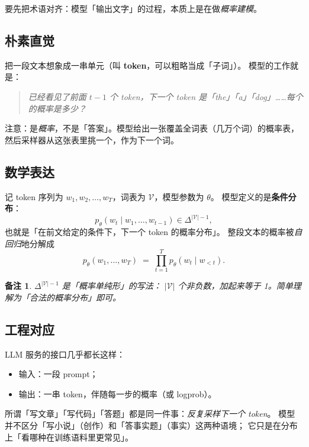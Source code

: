\documentclass[11pt,a4paper]{ctexart}
\newtheorem{remark}[theorem]{备注}
\begin{document}
要先把术语对齐：模型「输出文字」的过程，本质上是在做\emph{概率建模}。

\subsection{朴素直觉}

\begin{intuitionblock}
把一段文本想象成一串单元（叫 \textbf{token}，可以粗略当成「子词」）。
模型的工作就是：
\begin{quote}
\textit{已经看见了前面 $t-1$ 个 token，下一个 token 是「the」「a」「dog」……每个的概率是多少？}
\end{quote}
注意：是\emph{概率}，不是「答案」。模型给出一张覆盖全词表（几万个词）的概率表，
然后采样器从这张表里挑一个，作为下一个词。
\end{intuitionblock}

\subsection{数学表达}

记 token 序列为 $w_1, w_2, \dots, w_T$，词表为 $\mathcal{V}$，模型参数为 $\theta$。
模型定义的是\textbf{条件分布}：
\[
  p_\theta(w_t \mid w_1, \dots, w_{t-1}) \in \Delta^{|\mathcal{V}|-1},
\]
也就是「在前文给定的条件下，下一个 token 的概率分布」。
整段文本的概率被\emph{自回归}地分解成
\[
  p_\theta(w_1, \dots, w_T) \;=\; \prod_{t=1}^{T} p_\theta(w_t \mid w_{<t}).
\]

\begin{remark}
$\Delta^{|\mathcal{V}|-1}$ 是「概率单纯形」的写法：
$|\mathcal{V}|$ 个非负数，加起来等于 1。简单理解为「合法的概率分布」即可。
\end{remark}

\subsection{工程对应}

\begin{engbox}
LLM 服务的接口几乎都长这样：
\begin{itemize}
  \item 输入：一段 prompt；
  \item 输出：一串 token，伴随每一步的概率（或 logprob）。
\end{itemize}
所谓「写文章」「写代码」「答题」都是同一件事：\emph{反复采样下一个 token}。
模型并不区分「写小说」（创作）和「答事实题」（事实）这两种语境；
它只是在分布上「看哪种在训练语料里更常见」。
\end{engbox}
\end{document}
